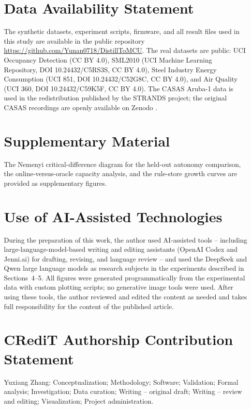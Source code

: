 \documentclass[review]{elsarticle}
\begin{document}
\section*{Data Availability Statement}
The synthetic datasets, experiment scripts, firmware, and all result files
used in this study are available in the public repository
\url{https://github.com/Yunan0718/DistillToMCU}.
The real datasets are public: UCI Occupancy Detection (CC BY 4.0), SML2010
(UCI Machine Learning Repository, DOI 10.24432/C5RS3S, CC BY 4.0), Steel
Industry Energy Consumption (UCI 851, DOI 10.24432/C52G8C, CC BY 4.0), and
Air Quality (UCI 360, DOI 10.24432/C59K5F, CC BY 4.0). The CASAS Aruba-1
data is used in the redistribution published by the STRANDS project; the
original CASAS recordings are openly available on Zenodo \cite{32}.

\section*{Supplementary Material}
The Nemenyi critical-difference diagram for the held-out autonomy comparison,
the online-versus-oracle capacity analysis, and the rule-store growth curves
are provided as supplementary figures.

\section*{Use of AI-Assisted Technologies}
During the preparation of this work, the author used AI-assisted tools --
including large-language-model-based writing and editing assistants (OpenAI
Codex and Jenni.ai) for drafting, revising, and language review -- and used
the DeepSeek and Qwen large language models as research subjects in the
experiments described in Sections~4--5. All figures were generated
programmatically from the experimental data with custom plotting scripts;
no generative image tools were used. After using these tools, the author
reviewed and edited the content as needed and takes full responsibility for
the content of the published article.

\section*{CRediT Authorship Contribution Statement}
Yuxiang Zhang: Conceptualization; Methodology; Software; Validation; Formal
analysis; Investigation; Data curation; Writing -- original draft; Writing --
review and editing; Visualization; Project administration.
\end{document}
